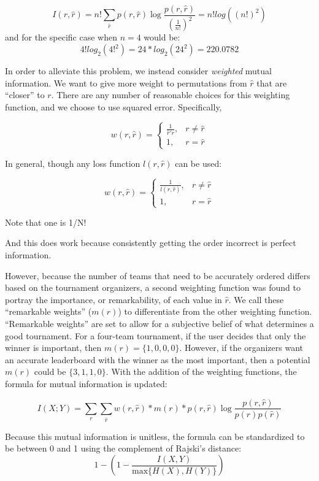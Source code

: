 \documentclass[
  12pt,
]{article}
\begin{document}
\[
I(r,\hat{r})= n!\sum_{\hat{r}}p(r,\hat{r})\log \frac {p(r,\hat{r})}{\left(\frac{1}{n!}\right)^2} = n! log((n!)^2)
\] and for the specific case when \(n=4\) would be: \[
4! log_2(4!^2) = 24*log_2(24^2) = 220.0782
\]

In order to alleviate this problem, we instead consider \emph{weighted}
mutual information. We want to give more weight to permutations from
\(\hat{r}\) that are ``closer'' to \(r\). There are any number of
reasonable choices for this weighting function, and we choose to use
squared error. Specifically,

\[
w(r, \hat{r}) =
\begin{cases}
\frac{1}{\hat{r}'r}, & r \ne \hat{r} \\
1, & r = \hat{r}
\end{cases}
\]

In general, though any loss function \(l(r, \hat{r})\) can be used:

\[
w(r, \hat{r}) =
\begin{cases}
\frac{1}{l(r, \hat{r})}, & r \ne \hat{r} \\
1, & r = \hat{r}
\end{cases}
\]

Note that one is 1/N!

And this does work because consistently getting the order incorrect is
perfect information.

However, because the number of teams that need to be accurately ordered
differs based on the tournament organizers, a second weighting function
was found to portray the importance, or remarkability, of each value in
\(\hat{r}\). We call these ``remarkable weights'' (\(m(r)\)) to
differentiate from the other weighting function. ``Remarkable weights''
are set to allow for a subjective belief of what determines a good
tournament. For a four-team tournament, if the user decides that only
the winner is important, then \(m(r) = \{1,0,0,0\}\). However, if the
organizers want an accurate leaderboard with the winner as the most
important, then a potential \(m(r)\) could be \(\{3,1,1,0\}\). With the
addition of the weighting functions, the formula for mutual information
is updated:

\[
I(X;Y)=\sum_{r}\sum_{\hat{r}} w(r,\hat{r}) * m(r) * p(r,\hat{r})\log \frac {p(r,\hat{r})}{p(r)p(\hat{r})}
\]

Because this mutual information is unitless, the formula can be
standardized to be between 0 and 1 using the complement of Rajski's
distance: \[
1 - (1 - \frac{I(X,Y)}{\text{max\{}H(X), H(Y)\}})
\]
\end{document}
